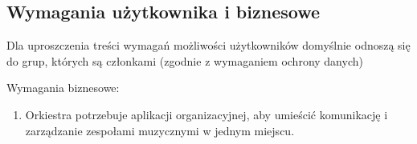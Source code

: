 \documentclass[11pt,a4paper]{article}
\renewcommand{\_}{\char`_}
\begin{document}
\subsection{Wymagania użytkownika i biznesowe}

Dla uproszczenia treści wymagań możliwości użytkowników domyślnie odnoszą się do grup, których są członkami (zgodnie z wymaganiem ochrony danych)

Wymagania biznesowe:
\begin{enumerate}
    \item Orkiestra potrzebuje aplikacji organizacyjnej, aby umieścić komunikację i zarządzanie zespołami muzycznymi w jednym miejscu.
\end{enumerate}

\vspace{10pt}
\end{document}
